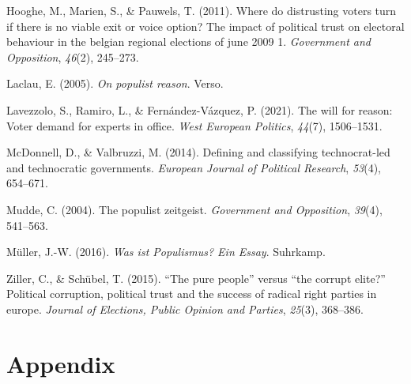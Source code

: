 \documentclass[
  12pt,
  english,
]{article}
\newlength{\cslhangindent}
\newlength{\cslentryspacingunit} %
\newenvironment{CSLReferences}[2] %
 {%
  \setlength{\parindent}{0pt}
  \ifodd #1
  \let\oldpar\par
  \def\par{\hangindent=\cslhangindent\oldpar}
  \fi
  \setlength{\parskip}{#2\cslentryspacingunit}
 }%
 {}
\begin{document}
\begin{CSLReferences}{1}{0}
\leavevmode{}%
Hooghe, M., Marien, S., \& Pauwels, T. (2011). Where do distrusting
voters turn if there is no viable exit or voice option? The impact of
political trust on electoral behaviour in the belgian regional elections
of june 2009 1. \emph{Government and Opposition}, \emph{46}(2),
245--273.

\leavevmode{}%
Laclau, E. (2005). \emph{On populist reason}. Verso.

\leavevmode{}%
Lavezzolo, S., Ramiro, L., \& Fernández-Vázquez, P. (2021). The will for
reason: Voter demand for experts in office. \emph{West European
Politics}, \emph{44}(7), 1506--1531.

\leavevmode{}%
McDonnell, D., \& Valbruzzi, M. (2014). Defining and classifying
technocrat-led and technocratic governments. \emph{European Journal of
Political Research}, \emph{53}(4), 654--671.

\leavevmode{}%
Mudde, C. (2004). The populist zeitgeist. \emph{Government and
Opposition}, \emph{39}(4), 541--563.

\leavevmode{}%
Müller, J.-W. (2016). \emph{Was ist {Populismus}? Ein {Essay}}.
Suhrkamp.

\leavevmode{}%
Ziller, C., \& Schübel, T. (2015). {``The pure people''} versus {``the
corrupt elite?''} Political corruption, political trust and the success
of radical right parties in europe. \emph{Journal of Elections, Public
Opinion and Parties}, \emph{25}(3), 368--386.

\end{CSLReferences}

\newpage{}

\hypertarget{appendix}{%
\section{Appendix}\label{appendix}}
\end{document}
